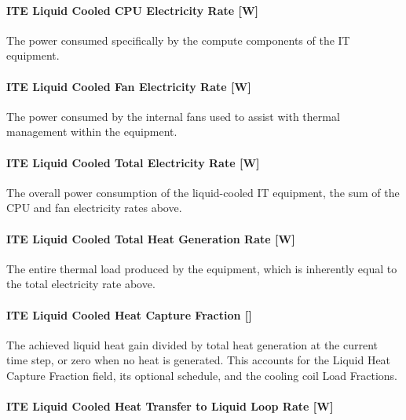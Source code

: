 \paragraph{ITE Liquid Cooled CPU Electricity Rate {[}W{]}}\label{ite-cpu-electricity-rate-liquidcooled}

The power consumed specifically by the compute components of the IT equipment.

\paragraph{ITE Liquid Cooled Fan Electricity Rate {[}W{]}}\label{ite-fan-electricity-rate-liquidcooled}

The power consumed by the internal fans used to assist with thermal management within the equipment.

\paragraph{ITE Liquid Cooled Total Electricity Rate {[}W{]}}\label{ite-liquid-cooled-total-electricity-rate}

The overall power consumption of the liquid-cooled IT equipment, the sum of the CPU and fan electricity rates above.

\paragraph{ITE Liquid Cooled Total Heat Generation Rate {[}W{]}}\label{ite-liquid-cooled-total-heat-generation-rate}

The entire thermal load produced by the equipment, which is inherently equal to the total electricity rate above.

\paragraph{ITE Liquid Cooled Heat Capture Fraction {[]}}\label{ite-liquid-cooled-heat-capture-fraction}

The achieved liquid heat gain divided by total heat generation at the current time step, or zero when no heat is generated. This accounts for the Liquid Heat Capture Fraction field, its optional schedule, and the cooling coil Load Fractions.

\paragraph{ITE Liquid Cooled Heat Transfer to Liquid Loop Rate {[}W{]}}\label{ite-liquid-cooled-heat-transfer-to-liquid-loop-rate}


